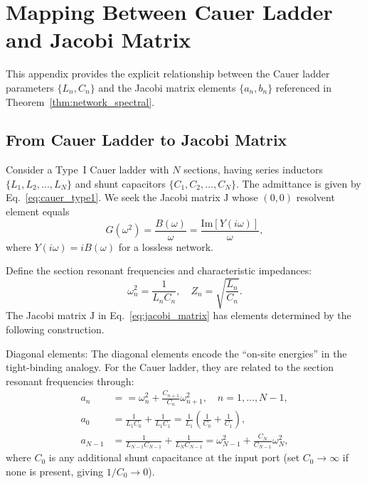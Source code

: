 \documentclass[reprint, floatfix, superscriptaddress, amsmath, amssymb, longbibliography]{revtex4-2}
\begin{document}
\appendix

\section{Mapping Between Cauer Ladder and Jacobi Matrix}
\label{app:lc_jacobi}

This appendix provides the explicit relationship between the Cauer ladder parameters $\{L_n, C_n\}$ and the Jacobi matrix elements $\{a_n, b_n\}$ referenced in Theorem~\ref{thm:network_spectral}.

\subsection{From Cauer Ladder to Jacobi Matrix}
\label{app:cauer_to_jacobi}

Consider a Type~I Cauer ladder with $N$ sections, having series inductors $\{L_1, L_2, \ldots, L_N\}$ and shunt capacitors $\{C_1, C_2, \ldots, C_N\}$. The admittance is given by Eq.~\eqref{eq:cauer_type1}. We seek the Jacobi matrix $\mathrm{J}$ whose $(0,0)$ resolvent element equals
\begin{equation}
G(\omega^2) = \frac{B(\omega)}{\omega} = \frac{\mathrm{Im}[Y(i\omega)]}{\omega},
\label{eq:G_def_app}
\end{equation}
where $Y(i\omega) = iB(\omega)$ for a lossless network.

Define the section resonant frequencies and characteristic impedances:
\begin{equation}
\omega_n^2 = \frac{1}{L_n C_n}, \quad Z_n = \sqrt{\frac{L_n}{C_n}}.
\label{eq:section_params}
\end{equation}
The Jacobi matrix $\mathrm{J}$ in Eq.~\eqref{eq:jacobi_matrix} has elements determined by the following construction.

{Diagonal elements:} The diagonal elements encode the ``on-site energies'' in the tight-binding analogy. For the Cauer ladder, they are related to the section resonant frequencies through:
\begin{align}
a_n &=  = \omega_n^2 + \frac{C_{n+1}}{C_n}\omega_{n+1}^2, \quad n = 1, \ldots, N-1, \label{eq:jacobi_diag_middle} \\
a_0 &= \frac{1}{L_1 C_0} + \frac{1}{L_1 C_1} = \frac{1}{L_1}\left(\frac{1}{C_0} + \frac{1}{C_1}\right), \label{eq:jacobi_diag_first} \\
a_{N-1} &= \frac{1}{L_{N-1} C_{N-1}} + \frac{1}{L_N C_{N-1}} = \omega_{N-1}^2 + \frac{C_N}{C_{N-1}}\omega_N^2, \label{eq:jacobi_diag_last}
\end{align}
where $C_0$ is any additional shunt capacitance at the input port (set $C_0 \to \infty$ if none is present, giving $1/C_0 \to 0$).
\end{document}

